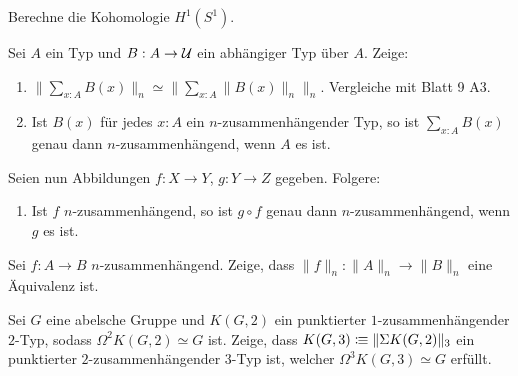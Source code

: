 \documentclass{hott-übung}
\begin{document}
\setcounter{blattnummer}{13}
\setcounter{aufgabennummer}{0}

\blatt

\aufgabe{}
Berechne die Kohomologie \(H^1(S^1)\).

\aufgabe{}
Sei \(A\) ein Typ und \(B : A \to \mathcal{U}\) ein abhängiger Typ über \(A\).
Zeige:
\begin{enumerate}
  \item \(\|\sum_{x:A}B(x)\|_n \simeq \|\sum_{x:A}\|B(x)\|_n\|_n\). {\tiny Vergleiche mit Blatt 9 A3.}
  \item Ist \(B(x)\) für jedes \(x : A\) ein \(n\)-zusammenhängender Typ, so ist \(\sum_{x : A} B(x)\) genau dann \(n\)-zusammenhängend, wenn \(A\) es ist.
\end{enumerate}
Seien nun Abbildungen \(f : X \to Y\), \(g : Y \to Z\) gegeben.
Folgere:
\begin{enumerate}[resume]
  \item Ist \(f\) \(n\)-zusammenhängend, so ist \(g\circ f\) genau dann \(n\)-zusammenhängend, wenn \(g\) es ist.
\end{enumerate}

\aufgabe{}
Sei \(f:A\to B\) \(n\)-zusammenhängend.
Zeige, dass \(\|f\|_n:\|A\|_n\to \|B\|_n\) eine Äquivalenz ist.

\aufgabe{}
Sei \(G\) eine abelsche Gruppe und \(K(G,2)\) ein punktierter \(1\)-zusammenhängender \(2\)-Typ, sodass \(\Omega^2 K(G,2) \simeq G\) ist.
Zeige, dass \(K(G,3) \vcentcolon\mspace{-1.2mu}\equiv \|\Sigma K(G,2)\|_3\) ein punktierter \(2\)-zusammenhängender \(3\)-Typ ist, welcher \(\Omega^3 K(G,3) \simeq G\) erfüllt.
\end{document}
